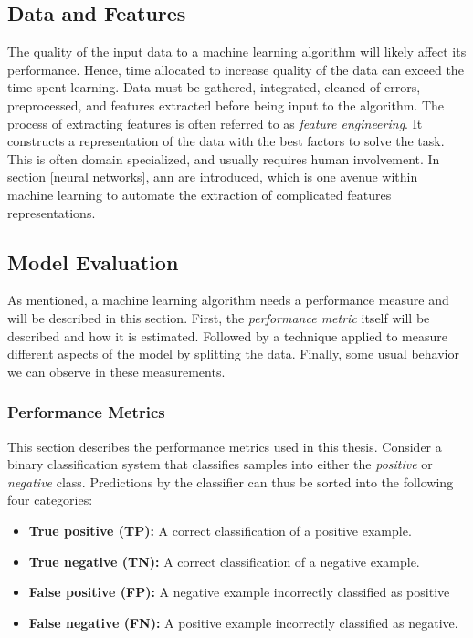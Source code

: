     \subsection{Data and Features}
    The quality of the input data to a machine learning algorithm will likely affect its performance\cite{najafabadi2015deep}. Hence, time allocated to increase quality of the data can exceed the time spent learning.  Data must be gathered, integrated, cleaned of errors, preprocessed, and features extracted before being input to the algorithm. The process of extracting features is often referred to as \textit{feature engineering}. It constructs a representation of the data with the best factors to solve the task. This is often domain specialized, and usually requires human involvement. In section \ref{neural networks}, \gls{ann} are introduced, which is one avenue within machine learning to automate the extraction of complicated features representations.

    \subsection{Model Evaluation}
    As mentioned, a machine learning algorithm needs a performance measure and will be described in this section. First, the \textit{performance metric} itself will be described and how it is estimated. Followed by a technique applied to measure different aspects of the model by splitting the data. Finally, some usual behavior we can observe in these measurements.
    
    \subsubsection{Performance Metrics} \label{f1_score}
        This section describes the performance metrics used in this thesis. Consider a binary classification system that classifies samples into either the \textit{positive} or \textit{negative} class\cite{powers2020evaluation_f1_recall_precision}. Predictions by the classifier can thus be sorted into the following four categories:
        
        \begin{itemize}
            \item \textbf{True positive (TP):} A correct classification of a positive example.
            \item \textbf{True negative (TN):} A correct classification of a negative example.
            \item \textbf{False positive (FP):} A negative example incorrectly classified as positive
            \item \textbf{False negative (FN):} A positive example incorrectly classified as negative.
            \end{itemize}
        
